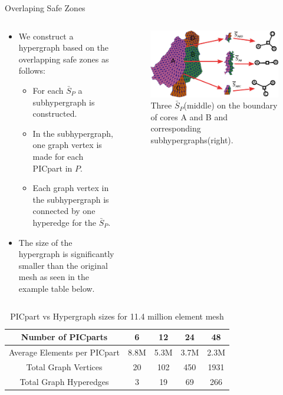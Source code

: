 \documentclass[aspectratio=169]{beamer}
\begin{document}
\begin{frame}{Overlaping Safe Zones}
  \begin{columns}
    \begin{column}{.5\textwidth}
      \begin{itemize}
      \item We construct a hypergraph based on the overlapping safe zones as follows:
        \begin{itemize}
        \item For each $\bar{S}_P$ a subhypergraph is constructed.
        \item In the subhypergraph, one graph vertex is made for each PICpart in $P$.
        \item Each graph vertex in the subhypergraph is connected by one hyperedge for the $\bar{S}_P$.
        \end{itemize}
      \item The size of the hypergraph is significantly smaller than the original mesh as seen in the example table below.
      \end{itemize}
    \end{column}
    \begin{column}{.5\textwidth}
      \begin{figure}
        \includegraphics[width=.95\textwidth]{picpart_lb_new.eps}
        \caption*{Three $\bar{S}_P$(middle) on the boundary of cores A and B and corresponding subhypergraphs(right).}
      \end{figure}
    \end{column}
  \end{columns}
  \begin{table}
    \caption*{PICpart vs Hypergraph sizes for 11.4 million element mesh}
    \vspace{.1in}
    \begin{tabular}{|c|c|c|c|c|}
      \hline
      Number of PICparts & 6 & 12 & 24 & 48 \\
      \hline
      Average Elements per PICpart & 8.8M & 5.3M & 3.7M & 2.3M\\
      \hline
      Total Graph Vertices & 20 & 102 & 450 & 1931 \\
      \hline
      Total Graph Hyperedges & 3 & 19 & 69 & 266 \\
      \hline
    \end{tabular}
  \end{table}
\end{frame}
\end{document}
